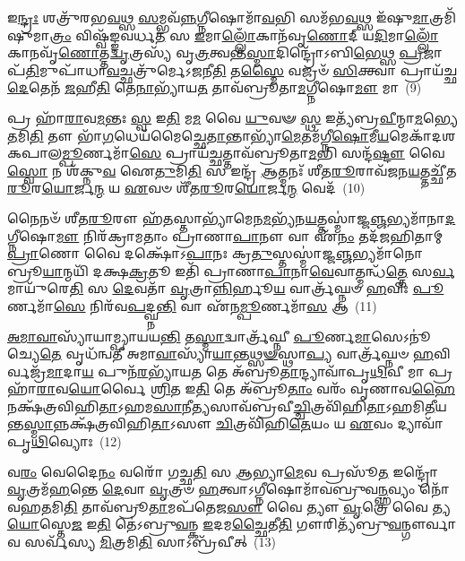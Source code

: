 𑌇\-\ul{𑌨𑍍𑌦𑍍𑌰𑌃} 𑌶𑌤𑍍𑌰𑍁᳴𑌰𑌭\-\ul{𑌵}\-𑌥𑍍𑌸 \ul{𑌸}\-𑌮𑍍𑌭𑌵᳴\-\ul{𑌨𑍍𑌨}\-𑌗𑍍𑌨𑍀𑌷𑍋𑌮𑌾᳴\-\ul{𑌵}\-𑌭𑌿 𑌸𑌮᳴𑌭\-\ul{𑌵}\-𑌥𑍍𑌸 𑌇᳴𑌷𑍁\-\ul{𑌮𑌾}\-𑌤𑍍𑌰𑌮𑌿᳴𑌷𑍁𑌮𑌾\-\ul{𑌤𑍍𑌰𑌂} 𑌵𑌿𑌷𑍍𑌵᳴𑌙𑍍𑌙𑌵𑌰𑍍𑌧\-\ul{𑌤} 𑌸 \ul{𑌇}\-𑌮𑌾\-\ul{𑌲𑍍𑌲𑍋𑌁}\-𑌕𑌾𑌨᳴𑌵𑍃\-\ul{𑌣𑍋}\-𑌦𑍍 𑌯\-\ul{𑌦𑌿}\-𑌮𑌾\-\ul{𑌲𑍍𑌲𑍋𑌁}\-𑌕𑌾𑌨𑌵𑍃᳴\-\ul{𑌣𑍋}\-𑌤𑍍𑌤\-\ul{𑌦𑍍𑌵𑍃}\-𑌤𑍍𑌰𑌸𑍍𑌯᳴ 𑌵𑍃\-\ul{𑌤𑍍𑌰}\-𑌤𑍍𑌵𑌨𑍍𑌤\-\ul{𑌸𑍍𑌮𑌾}\-𑌦𑌿𑌨𑍍𑌦𑍍𑌰𑍋᳴\-𑌽𑌬𑌿\-\ul{𑌭𑍇}\-𑌥𑍍𑌸 \ul{𑌪𑍍𑌰}\-𑌜𑌾𑌪᳴\-\ul{𑌤𑌿}\-𑌮𑍁𑌪𑌾᳴𑌧𑌾\-\ul{𑌵}\-𑌚𑍍𑌛𑌤𑍍𑌰𑍁᳴𑌰𑍍𑌮𑍇\-𑌽\-\ul{𑌜}\-𑌨𑍀\-\ul{𑌤𑌿} 𑌤\-\ul{𑌸𑍍𑌮𑍈} 𑌵𑌜𑍍𑌰𑍞᳴ \ul{𑌸𑌿}\-𑌕𑍍𑌤𑍍𑌵𑌾 𑌪𑍍𑌰𑌾𑌯᳴𑌚𑍍𑌛\-\ul{𑌦𑍇}\-𑌤𑍇𑌨᳴ \ul{𑌜}\-𑌹𑍀\-\ul{𑌤𑌿} 𑌤𑍇\-\ul{𑌨𑌾}\-𑌭𑍍𑌯𑌾᳴𑌯\-\ul{𑌤} 𑌤𑌾𑌵᳴𑌬𑍍𑌰𑍂𑌤𑌾\-\ul{𑌮}\-𑌗𑍍𑌨𑍀𑌷𑍋\-\ul{𑌮𑍗} 𑌮𑌾~(9)

𑌪𑍍𑌰 𑌹𑌾᳴\-\ul{𑌰𑌾}\-𑌵\-\ul{𑌮}\-𑌨𑍍𑌤𑌃 \ul{𑌸𑍍𑌵} 𑌇\-\ul{𑌤𑌿} 𑌮\-\ul{𑌮} 𑌵𑍈 \ul{𑌯𑍁}\-𑌵𑍟 \ul{𑌸𑍍𑌥} 𑌇𑌤𑍍𑌯᳴𑌬𑍍𑌰\-\ul{𑌵𑍀}\-𑌨𑍍𑌮𑌾\-\ul{𑌮}\-𑌭𑍍𑌯𑍇\-\ul{𑌤}\-𑌮𑌿\-\ul{𑌤𑌿} 𑌤𑍗 𑌭𑌾᳴\-\ul{𑌗}\-𑌧𑍇𑌯᳴𑌮𑍈𑌚𑍍𑌛𑍇\-\ul{𑌤𑌾}\-𑌨𑍍𑌤𑌾𑌭𑍍𑌯𑌾᳴\-\ul{𑌮𑍇}\-𑌤𑌮᳴𑌗𑍍𑌨𑍀\-\ul{𑌷𑍋}\-𑌮𑍀\-\ul{𑌯}\-\-𑌮𑍇𑌕𑌾᳴\-𑌦𑌶\-𑌕𑌪𑌾𑌲\-\ul{𑌮𑍍𑌪𑍂}\-𑌰𑍍𑌣𑌮𑌾᳴\-\ul{𑌸𑍇} 𑌪𑍍𑌰𑌾𑌯᳴\-\ul{𑌚𑍍𑌛}\-𑌤𑍍𑌤𑌾𑌵᳴𑌬𑍍𑌰𑍂𑌤𑌾\-\ul{𑌮}\-𑌭𑌿 𑌸𑌨𑍍𑌦᳴\-\ul{𑌷𑍍𑌟𑍗} 𑌵𑍈 \ul{𑌸𑍍𑌵𑍋} 𑌨 𑌶᳴𑌕𑍍𑌨𑍁\-\ul{𑌵} 𑌐\-\ul{𑌤𑍁}\-𑌮𑌿\-\ul{𑌤𑌿} 𑌸 𑌇𑌨𑍍𑌦𑍍𑌰᳴ \ul{𑌆}\-𑌤𑍍𑌮𑌨𑌃᳴ 𑌶𑍀𑌤\-\ul{𑌰𑍂}\-𑌰𑌾𑌵᳴𑌜𑌨\-\ul{𑌯}\-𑌤𑍍𑌤𑌚𑍍𑌛𑍀᳴𑌤\-\ul{𑌰𑍂}\-𑌰\-\ul{𑌯𑍋}\-𑌰𑍍𑌜\-\ul{𑌨𑍍𑌮} 𑌯 \ul{𑌏}\-𑌵𑍞 𑌶𑍀᳴𑌤\-\ul{𑌰𑍂}\-𑌰\-\ul{𑌯𑍋}\-𑌰𑍍𑌜\-\ul{𑌨𑍍𑌮} 𑌵𑍇𑌦᳴~(10)


𑌨𑍈𑌨𑍞᳴ 𑌶𑍀𑌤\-\ul{𑌰𑍂}\-𑌰𑍗 𑌹᳴\-\ul{𑌤}\-𑌸𑍍𑌤𑌾𑌭𑍍𑌯𑌾᳴𑌮𑍇𑌨\-\ul{𑌮}\-𑌭𑍍𑌯᳴𑌨\-\ul{𑌯}\-𑌤𑍍𑌤𑌸𑍍𑌮𑌾॑𑌜𑍍𑌜\-\ul{𑌞𑍍𑌜}\-𑌭𑍍𑌯𑌮𑌾᳴𑌨𑌾\-\ul{𑌦}\-𑌗𑍍𑌨𑍀𑌷𑍋\-\ul{𑌮𑍗} 𑌨𑌿𑌰᳴𑌕𑍍𑌰𑌾𑌮𑌤𑌾𑌂 𑌪𑍍𑌰𑌾𑌣𑌾\-\ul{𑌪𑌾}\-𑌨𑍗 𑌵𑌾 𑌏᳴\-\ul{𑌨𑌂} 𑌤𑌦᳴𑌜𑌹𑌿𑌤𑌾𑌮𑍍 \ul{𑌪𑍍𑌰𑌾}\-𑌣𑍋 𑌵𑍈 𑌦𑌕𑍍𑌷𑍋᳴\-𑌽\-\ul{𑌪𑌾}\-𑌨𑌃 𑌕𑍍𑌰\-\ul{𑌤𑍁}\-𑌸𑍍𑌤𑌸𑍍𑌮𑌾॑𑌜𑍍𑌜\-\ul{𑌞𑍍𑌜}\-𑌭𑍍𑌯𑌮𑌾᳴𑌨𑍋 𑌬𑍍𑌰𑍂\-\ul{𑌯𑌾}\-𑌨𑍍𑌮𑌯𑌿᳴ 𑌦𑌕𑍍𑌷\-\ul{𑌕𑍍𑌰}\-𑌤𑍂 𑌇𑌤𑌿᳴ 𑌪𑍍𑌰𑌾𑌣𑌾\-\ul{𑌪𑌾}\-𑌨𑌾\-\ul{𑌵𑍇}\-𑌵𑌾𑌤𑍍𑌮𑌨𑍍𑌧᳴\-\ul{𑌤𑍍𑌤𑍇} 𑌸\-\ul{𑌰𑍍𑌵}\-𑌮𑌾𑌯𑍁᳴𑌰𑍇\-\ul{𑌤𑌿} 𑌸 \ul{𑌦𑍇}\-𑌵𑌤𑌾᳴ \ul{𑌵𑍃}\-𑌤𑍍𑌰𑌾\-\ul{𑌨𑍍𑌨𑌿}\-𑌰𑍍\mbox{}𑌹𑍂\-\ul{𑌯} 𑌵𑌾𑌰𑍍𑌤𑍍𑌰᳴𑌘𑍍𑌨𑍞 \ul{𑌹}\-𑌵𑌿𑌃 \ul{𑌪𑍂}\-𑌰𑍍𑌣𑌮𑌾᳴\-\ul{𑌸𑍇} 𑌨𑌿𑌰᳴𑌵\-\ul{𑌪}\-𑌦𑍍𑌘𑍍𑌨\-\ul{𑌨𑍍𑌤𑌿} 𑌵𑌾 𑌏᳴𑌨\-\ul{𑌮𑍍𑌪𑍂}\-𑌰𑍍𑌣𑌮𑌾᳴\-\ul{𑌸} 𑌆~(11)

\-\ul{𑌅}\-\-\ul{𑌮𑌾}\-\-\ul{𑌵𑌾}\-𑌸𑍍𑌯𑌾᳴𑌯𑌾𑌮𑍍𑌪𑍍𑌯𑌾𑌯𑌯\-\ul{𑌨𑍍𑌤𑌿} 𑌤\-\ul{𑌸𑍍𑌮𑌾}\-𑌦𑍍𑌵𑌾𑌰𑍍𑌤𑍍𑌰᳴𑌘𑍍𑌨𑍀 \ul{𑌪𑍂}\-𑌰𑍍𑌣\-\ul{𑌮𑌾}\-𑌸𑍇\-𑌽𑌨𑍂॑𑌚𑍍𑌯𑍇\-\ul{𑌤𑍇} 𑌵𑍃𑌧᳴𑌨𑍍𑌵𑌤𑍀 𑌅𑌮𑌾\-\ul{𑌵𑌾}\-𑌸𑍍𑌯𑌾᳴\-\ul{𑌯𑌾}\-𑌨𑍍𑌤\-\ul{𑌥𑍍𑌸}\-\-\ul{𑍟}\-𑌸𑍍𑌥𑌾\-\ul{𑌪𑍍𑌯} 𑌵𑌾𑌰𑍍𑌤𑍍𑌰᳴𑌘𑍍𑌨𑍞 \ul{𑌹}\-𑌵𑌿𑌰𑍍𑌵𑌜𑍍𑌰᳴\-\ul{𑌮𑌾}\-𑌦𑌾\-\ul{𑌯} 𑌪𑍁𑌨᳴\-\ul{𑌰}\-𑌭𑍍𑌯𑌾᳴𑌯\-\ul{𑌤} 𑌤𑍇 𑌅᳴𑌬𑍍𑌰𑍂\-\ul{𑌤𑌾}\-𑌨𑍍𑌦𑍍𑌯𑌾𑌵𑌾᳴𑌪𑍃\-\ul{𑌥𑌿}\-𑌵𑍀 𑌮𑌾 𑌪𑍍𑌰 𑌹𑌾᳴\-\ul{𑌰𑌾}\-𑌵\-\ul{𑌯𑍋}\-𑌰𑍍𑌵𑍈 \ul{𑌶𑍍𑌰𑌿}\-𑌤 𑌇\-\ul{𑌤𑌿} 𑌤𑍇 𑌅᳴𑌬𑍍𑌰𑍂\-\ul{𑌤𑌾𑌂} 𑌵𑌰𑌂᳴ 𑌵𑍃𑌣𑌾𑌵\-\ul{𑌹𑍈} 𑌨𑌕𑍍𑌷᳴𑌤𑍍𑌰𑌵𑌿𑌹𑌿\-\ul{𑌤𑌾}\-\-𑌽𑌹𑌮\-\ul{𑌸𑌾}\-𑌨𑍀\-\ul{𑌤𑍍𑌯}\-𑌸𑌾𑌵᳴𑌬𑍍𑌰𑌵𑍀\-\ul{𑌚𑍍𑌚𑌿}\-𑌤𑍍𑌰𑌵𑌿᳴𑌹𑌿\-\ul{𑌤𑌾}\-\-𑌽𑌹𑌮𑌿\-\ul{𑌤𑍀}\-𑌯𑌨𑍍𑌤\-\ul{𑌸𑍍𑌮𑌾}\-𑌨𑍍𑌨𑌕𑍍𑌷᳴𑌤𑍍𑌰𑌵𑌿𑌹𑌿\-\ul{𑌤𑌾}\-\-𑌽𑌸𑍗 \ul{𑌚𑌿}\-𑌤𑍍𑌰𑌵𑌿᳴𑌹𑌿\-\ul{𑌤𑍇}\-𑌯𑌂 𑌯 \ul{𑌏}\-𑌵𑌂 𑌦𑍍𑌯𑌾𑌵𑌾᳴𑌪𑍃\-\ul{𑌥𑌿}\-𑌵𑍍𑌯𑍋𑌃~(12)

𑌵\-\ul{𑌰𑌂} 𑌵𑍇𑌦𑍈\-\ul{𑌨𑌂} 𑌵𑌰𑍋᳴ 𑌗𑌚𑍍𑌛\-\ul{𑌤𑌿} 𑌸 \ul{𑌆}\-𑌭𑍍𑌯𑌾\-\ul{𑌮𑍇}\-𑌵 𑌪𑍍𑌰𑌸𑍂᳴\-\ul{𑌤} 𑌇𑌨𑍍𑌦𑍍𑌰𑍋᳴ \ul{𑌵𑍃}\-𑌤𑍍𑌰𑌮᳴\-\ul{𑌹}\-𑌨𑍍𑌤𑍇 \ul{𑌦𑍇}\-𑌵𑌾 \ul{𑌵𑍃}\-𑌤𑍍𑌰𑍞 \ul{𑌹}\-𑌤𑍍𑌵𑌾\-𑌽𑌗𑍍𑌨𑍀𑌷𑍋𑌮𑌾᳴𑌵𑌬𑍍𑌰𑍁𑌵\-\ul{𑌨𑌼𑍍𑌹}\-𑌵𑍍𑌯𑌂 𑌨𑍋᳴ 𑌵𑌹\-\ul{𑌤}\-𑌮𑌿\-\ul{𑌤𑌿} 𑌤𑌾𑌵᳴𑌬𑍍𑌰𑍂\-\ul{𑌤𑌾}\-𑌮𑌪᳴𑌤𑍇𑌜\-\ul{𑌸𑍗} 𑌵𑍈 𑌤𑍍𑌯𑍗 \ul{𑌵𑍃}\-𑌤𑍍𑌰𑍇 𑌵𑍈 𑌤𑍍𑌯\-\ul{𑌯𑍋}\-𑌸𑍍𑌤𑍇\-\ul{𑌜} 𑌇\-\ul{𑌤𑌿} 𑌤𑍇॑\-𑌽𑌬𑍍𑌰𑍁\-\ul{𑌵}\-𑌨𑍍𑌕 \ul{𑌇}\-𑌦𑌮\-\ul{𑌚𑍍𑌛𑍈}\-𑌤𑍀\-\ul{𑌤𑌿} 𑌗𑍗𑌰𑌿𑌤𑍍𑌯᳴𑌬𑍍𑌰𑍁\-\ul{𑌵}\-𑌨𑍍𑌗𑍗𑌰𑍍𑌵𑌾𑌵 𑌸𑌰𑍍𑌵᳴𑌸𑍍𑌯 \ul{𑌮𑌿}\-𑌤𑍍𑌰𑌮𑌿\-\ul{𑌤𑌿} 𑌸𑌾\-𑌽𑌬𑍍𑌰᳴𑌵𑍀𑌤𑍍~(13)

